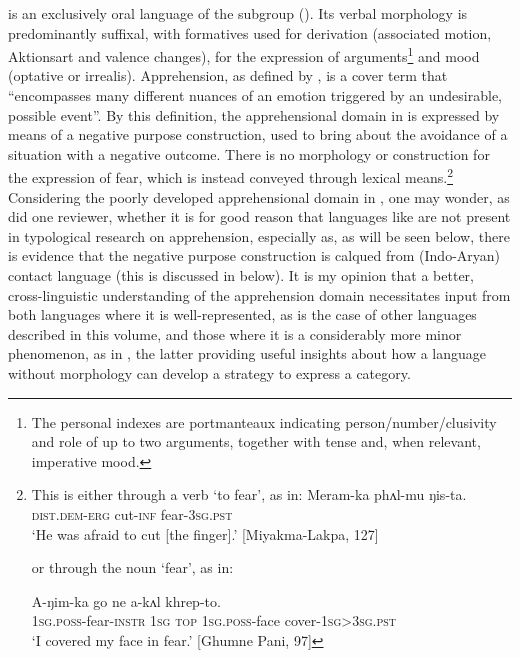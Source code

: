 \documentclass[output=paper,colorlinks,citecolor=brown]{langscibook}
\begin{document}
 is an exclusively oral language of the  subgroup (). Its verbal morphology is predominantly suffixal, with formatives used for derivation (associated motion, Aktionsart and valence changes), for the expression of arguments\footnote{The personal indexes are portmanteaux indicating person/number/clusivity and role of up to two arguments, together with tense and, when relevant, imperative mood.} and mood (optative or irrealis). Apprehension, as defined by \citet[262]{vuillermet2018a}, is a cover term that ``encompasses many different nuances of an emotion triggered by an undesirable, possible event''. By this definition, the apprehensional domain in  is expressed by means of a negative purpose construction, used to bring about the avoidance of a situation with a negative outcome. There is no morphology or construction for the expression of fear, which is instead conveyed through lexical means.\footnote{This is either through a verb `to fear', as in:
\ea \label{footnoteex}
\gll Meram-ka phʌl-mu ŋis-ta. \\
\textsc{dist.dem-erg} cut-\textsc{inf} fear-\textsc{3sg.pst} \\
\glt `He was afraid to cut [the finger].' [Miyakma-Lakpa, 127]
\z

or through the noun `fear', as in:

\ea \label{footnoteex2}
\gll A-ŋim-ka go ne a-kʌl khrep-to. \\
\textsc{1sg.poss}-fear-\textsc{instr} \textsc{1sg} \textsc{top} \textsc{1sg.poss}-face cover-\textsc{1sg>3sg.pst} \\
\glt `I covered my face in fear.' [Ghumne Pani, 97]
\z} Considering the poorly developed apprehensional domain in , one may wonder, as did one reviewer, whether it is for good reason that languages like  are not present in typological research on apprehension, especially as, as will be seen below, there is evidence that the  negative purpose construction is calqued from (Indo-Aryan) contact language  (this is discussed in  below). It is my opinion that a better, cross-linguistic understanding of the apprehension domain necessitates input from both languages where it is well-represented, as is the case of other languages described in this volume, and those where it is a considerably more minor phenomenon, as in , the latter providing useful insights about how a language without morphology can develop a strategy to express a category.
\end{document}
